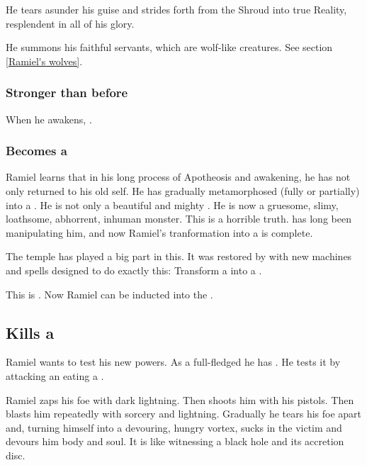 He tears asunder his \human{} guise and strides forth from the Shroud into true Reality, resplendent in all of his \sathariah{} glory. 

He summons his faithful servants, which are wolf-like creatures. See section \ref{Ramiel's wolves}. 





\subsubsection{Stronger than before}
When he awakens, . 





\subsubsection{Becomes a \neoresphan}
Ramiel learns that in his long process of Apotheosis and awakening, he has not only returned to his old self. 
He has gradually metamorphosed (fully or partially) into a \neoresphan.
He is not only a beautiful and mighty \resphan. 
He is now a gruesome, slimy, loathsome, abhorrent, inhuman monster. 
This is a horrible truth. 
\Azraid has long been manipulating him, and now Ramiel's tranformation into a \neoresphan is complete. 

The temple has played a big part in this.
It was restored by \Azraid with new machines and spells designed to do exactly this:
Transform a \malach into a \neoresphan. 

This is . 
Now Ramiel can be inducted into the . 










\subsection{Kills a \resphan}
Ramiel wants to test his new powers. 
As a full-fledged \malach he has . 
He tests it by attacking an eating a \resphan. 

Ramiel zaps his foe with dark lightning. 
Then shoots him with his pistols.
Then blasts him repeatedly with sorcery and lightning.
Gradually he tears his foe apart and, turning himself into a devouring, hungry vortex, sucks in the victim and devours him body and soul.
It is like witnessing a black hole and its accretion disc.





